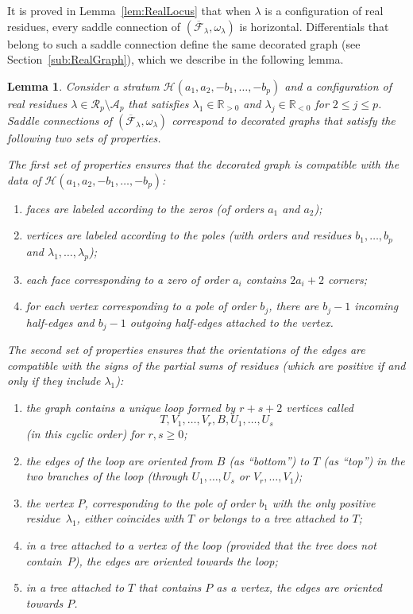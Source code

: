\documentclass[JEP,XML,SOM,Unicode,NoFloatCountersInSection,published]{cedram}
\newcommand\calH{{\mathcal H}}
\newtheorem{lem}[thm]{Lemma}
\theoremstyle{definition}
\begin{document}
It is proved in Lemma~\ref{lem:RealLocus} that when $\lambda$ is a configuration of real residues, every saddle connection of
$(\overline{\mathcal{F}}_{\lambda}, \omega_\lambda)$ is horizontal. Differentials that belong to such a saddle connection define the same decorated graph (see Section~\ref{sub:RealGraph}), which we describe in the following lemma.

\begin{lem}\label{lem:Sec8SaddleConnection}
Consider a stratum $\calH(a_{1},a_{2},-b_{1},\dots,-b_{p})$ and a configuration of real residues $\lambda\in \mathcal{R}_{p} \setminus \mathcal{A}_{p}$ that satisfies $\lambda_{1} \in \mathbb{R}_{>0}$ and $\lambda_{j} \in \mathbb{R}_{<0}$ for $2 \leq j \leq p$.
Saddle connections of $(\overline{\mathcal{F}}_{\lambda}, \omega_\lambda)$ correspond to decorated graphs that satisfy the following two sets of properties.

The first set of properties ensures that the decorated graph is compatible with the data of $\calH(a_{1},a_{2},-b_{1},\dots,-b_{p})$:
\begin{enumerate}
\item faces are labeled according to the zeros (of orders $a_{1}$ and $a_{2}$);
\item vertices are labeled according to the poles (with orders and residues $b_{1},\dots,b_{p}$ and $\lambda_{1},\dots,\lambda_{p}$);
\item each face corresponding to a zero of order $a_{i}$ contains $2a_{i}+2$ corners;
\item for each vertex corresponding to a pole of order $b_{j}$, there are $b_{j}-1$ incoming half-edges and $b_{j}-1$ outgoing half-edges attached to the vertex.
\end{enumerate}
The second set of properties ensures that the orientations of the edges are compatible with the signs of the partial sums of residues (which are positive if and only if they include $\lambda_{1}$):
\begin{enumerate}
\item the graph contains a unique loop formed by $r+s+2$ vertices called
\[
T,V_{1},\dots,V_{r},B,U_{1},\dots,U_{s}
\]
(in this cyclic order) for $r,s \geq 0$;
\item the edges of the loop are oriented from $B$ (as ``bottom'') to $T$ (as ``top'') in the two branches of the loop (through $U_{1},\dots,U_{s}$ or $V_{r},\dots,V_{1}$);
\item the vertex $P$, corresponding to the pole of order $b_{1}$ with the only positive residue~$\lambda_{1}$, either coincides with $T$ or belongs to a tree attached to $T$;
\item in a tree attached to a vertex of the loop (provided that the tree does not contain~$P$), the edges are oriented towards the loop;
\item in a tree attached to $T$ that contains $P$ as a vertex, the edges are oriented towards $P$.
\end{enumerate}


\end{lem}
\end{document}

